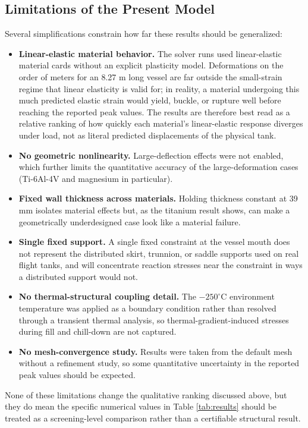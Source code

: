 \documentclass[conference]{IEEEtran}
\begin{document}
\subsection{Limitations of the Present Model}
Several simplifications constrain how far these results should be generalized:
\begin{itemize}
    \item \textbf{Linear-elastic material behavior.} The solver runs used linear-elastic material cards without an explicit plasticity model. Deformations on the order of meters for an 8.27 m long vessel are far outside the small-strain regime that linear elasticity is valid for; in reality, a material undergoing this much predicted elastic strain would yield, buckle, or rupture well before reaching the reported peak values. The results are therefore best read as a relative ranking of how quickly each material's linear-elastic response diverges under load, not as literal predicted displacements of the physical tank.
    \item \textbf{No geometric nonlinearity.} Large-deflection effects were not enabled, which further limits the quantitative accuracy of the large-deformation cases (Ti-6Al-4V and magnesium in particular).
    \item \textbf{Fixed wall thickness across materials.} Holding thickness constant at 39 mm isolates material effects but, as the titanium result shows, can make a geometrically underdesigned case look like a material failure.
    \item \textbf{Single fixed support.} A single fixed constraint at the vessel mouth does not represent the distributed skirt, trunnion, or saddle supports used on real flight tanks, and will concentrate reaction stresses near the constraint in ways a distributed support would not.
    \item \textbf{No thermal-structural coupling detail.} The $-250^{\circ}$C environment temperature was applied as a boundary condition rather than resolved through a transient thermal analysis, so thermal-gradient-induced stresses during fill and chill-down are not captured.
    \item \textbf{No mesh-convergence study.} Results were taken from the default mesh without a refinement study, so some quantitative uncertainty in the reported peak values should be expected.
\end{itemize}
None of these limitations change the qualitative ranking discussed above, but they do mean the specific numerical values in Table \ref{tab:results} should be treated as a screening-level comparison rather than a certifiable structural result.
\end{document}
